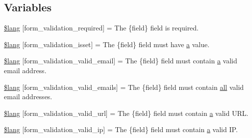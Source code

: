 \subsection*{Variables}
\begin{DoxyCompactItemize}
\item 
\hyperlink{system_2language_2english_2form__validation__lang_8php_a2335c24e2213207c5dda58ec093673a9}{\$lang} \mbox{[}\textquotesingle{}form\+\_\+validation\+\_\+required\textquotesingle{}\mbox{]} = \textquotesingle{}The \{field\} field is required.\textquotesingle{}
\item 
\hyperlink{system_2language_2english_2form__validation__lang_8php_a941575e651258a5a17341aca4e587898}{\$lang} \mbox{[}\textquotesingle{}form\+\_\+validation\+\_\+isset\textquotesingle{}\mbox{]} = \textquotesingle{}The \{field\} field must have \hyperlink{_admin_2assets_2js_2bootstrap_8min_8js_a1f5870dcf487187f13d5fd328ed9e6e7}{a} value.\textquotesingle{}
\item 
\hyperlink{system_2language_2english_2form__validation__lang_8php_a652d5be4d397dcac4407294c2436af34}{\$lang} \mbox{[}\textquotesingle{}form\+\_\+validation\+\_\+valid\+\_\+email\textquotesingle{}\mbox{]} = \textquotesingle{}The \{field\} field must contain \hyperlink{_admin_2assets_2js_2bootstrap_8min_8js_a1f5870dcf487187f13d5fd328ed9e6e7}{a} valid email address.\textquotesingle{}
\item 
\hyperlink{system_2language_2english_2form__validation__lang_8php_af9ec234a36f18a91c981985c3db4333e}{\$lang} \mbox{[}\textquotesingle{}form\+\_\+validation\+\_\+valid\+\_\+emails\textquotesingle{}\mbox{]} = \textquotesingle{}The \{field\} field must contain \hyperlink{change_team_8php_a5f3fcf87333f5770d16608f67ad88d19}{all} valid email addresses.\textquotesingle{}
\item 
\hyperlink{system_2language_2english_2form__validation__lang_8php_af9467e9ed3767f5bff205b79d706fe0a}{\$lang} \mbox{[}\textquotesingle{}form\+\_\+validation\+\_\+valid\+\_\+url\textquotesingle{}\mbox{]} = \textquotesingle{}The \{field\} field must contain \hyperlink{_admin_2assets_2js_2bootstrap_8min_8js_a1f5870dcf487187f13d5fd328ed9e6e7}{a} valid U\+R\+L.\textquotesingle{}
\item 
\hyperlink{system_2language_2english_2form__validation__lang_8php_a8d9bfb49825972af0deee31f8f9dccf2}{\$lang} \mbox{[}\textquotesingle{}form\+\_\+validation\+\_\+valid\+\_\+ip\textquotesingle{}\mbox{]} = \textquotesingle{}The \{field\} field must contain \hyperlink{_admin_2assets_2js_2bootstrap_8min_8js_a1f5870dcf487187f13d5fd328ed9e6e7}{a} valid I\+P.\textquotesingle{}

\end{DoxyCompactItemize}
